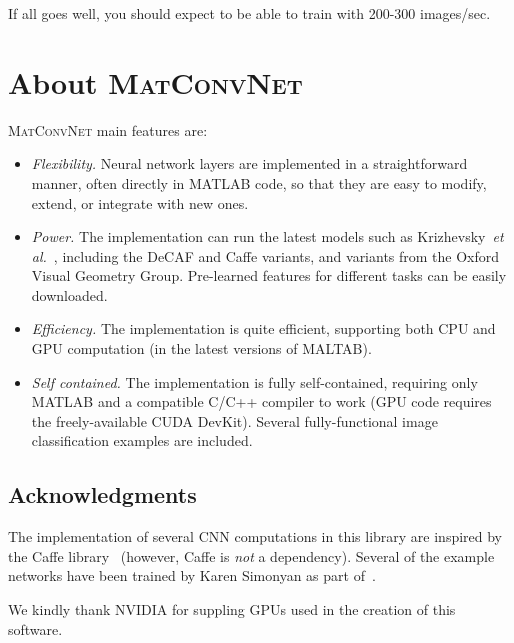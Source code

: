 \documentclass[12pt]{article}
\newcommand{\vlnn}{\textsc{MatConvNet}\xspace}
\begin{document}
If all goes well, you should expect to be able to train with 200-300 images/sec.

\section{About \vlnn}

\vlnn main features are:
\begin{itemize}
\item \emph{Flexibility.} Neural network layers are implemented in a straightforward manner, often directly in MATLAB code, so that they are easy to modify, extend, or integrate with new ones.
\item \emph{Power.} The implementation can run the latest models such as Krizhevsky~\textit{et al.}~\cite{krizhevsky12imagenet}, including the DeCAF and Caffe variants, and variants from the Oxford Visual Geometry Group. Pre-learned features for different tasks can be easily downloaded.
\item \emph{Efficiency.} The implementation is quite efficient, supporting both CPU and GPU computation (in the latest versions of MALTAB).
\item \emph{Self contained.} The implementation is fully self-contained, requiring only MATLAB and a compatible C/C++ compiler to work (GPU code requires the freely-available CUDA DevKit). Several fully-functional image classification examples are included.\end{itemize}

\subsection{Acknowledgments}\label{s:ack}

The implementation of several CNN computations in this library are inspired by the Caffe library~\cite{jia13caffe} (however, Caffe is \emph{not} a dependency). Several of the example networks have been trained by Karen Simonyan as part of~\cite{chatfield14return}.

We kindly thank NVIDIA for suppling GPUs used in the creation of this software.



\end{document}
